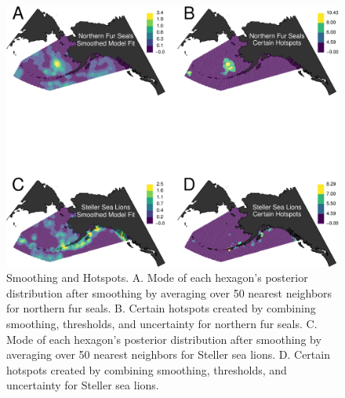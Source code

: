 \documentclass[11pt, titlepage]{article}
\begin{document}
\begin{spacing}{1.9}
\begin{flushleft}
\begin{figure}[H]
  \begin{center}
  \includegraphics[width=1\linewidth]{figures/Fig-SmooHotSpots-crop}
  \end{center}
  \caption{Smoothing and Hotspots. A. Mode of each hexagon's posterior distribution after smoothing by averaging over 50 nearest neighbors for northern fur seals. B. Certain hotspots created by combining smoothing, thresholds, and uncertainty for northern fur seals. C. Mode of each hexagon's posterior distribution after smoothing by averaging over 50 nearest neighbors for Steller sea lions. D. Certain hotspots created by combining smoothing, thresholds, and uncertainty for Steller sea lions. \label{Fig-SmooHotSpots}}         
\end{figure} 



\clearpage
\setcounter{equation}{0}
\renewcommand{\theequation}{A.\arabic{equation}}
\setcounter{figure}{0}


\end{flushleft}
\end{spacing}
\end{document}
